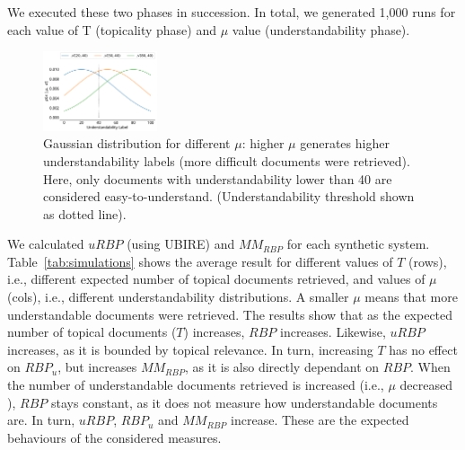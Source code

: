 We executed these two phases in succession. In total, we generated 1,000 runs for each value of T (topicality phase) and $\mu$ value (understandability phase). 

\begin{figure}[t!]
  \centering
   \includegraphics[width=0.30\textwidth]{figs/gaussians}
    \vspace{-.2cm}
    \caption{Gaussian distribution for different $\mu$: higher $\mu$ generates higher understandability labels (more difficult documents were retrieved). Here, only documents with understandability lower than 40 are considered easy-to-understand. (Understandability threshold shown as dotted line). \vspace{-16pt}}
  \label{fig:gaussians}
\end{figure}


We calculated $uRBP$ (using UBIRE) and $MM_{RBP}$ for each synthetic system.
Table~\ref{tab:simulations} shows the average result for different values of $T$ (rows), i.e., different expected number of topical documents retrieved, and values of $\mu$ (cols), i.e., different understandability distributions.
A smaller $\mu$ means that more understandable documents were retrieved. The results show that as the expected number of topical documents ($T$) increases, $RBP$ increases. Likewise, $uRBP$ increases, as it is bounded by topical relevance.
In turn, increasing $T$ has no effect on $RBP_u$, but increases $MM_{RBP}$, as it is also directly dependant on $RBP$. When the number of understandable documents retrieved is increased (i.e., $\mu$ decreased ), $RBP$ stays constant, as it does not measure how understandable documents are.
In turn, $uRBP$, $RBP_u$ and $MM_{RBP}$ increase. 
These are the expected behaviours of the considered measures. %

